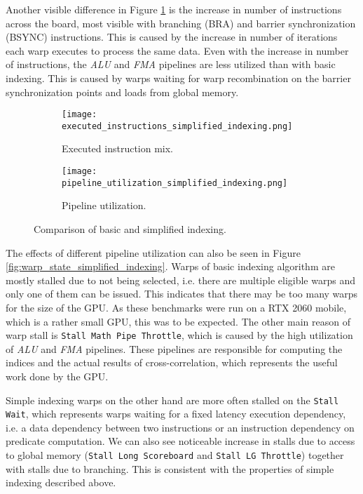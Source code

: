 Another visible difference in Figure \ref{fig:executed_instructions_simplified_indexing} is the increase in number of instructions across the board, most visible with branching (BRA) and barrier synchronization (BSYNC) instructions. This is caused by the increase in number of iterations each warp executes to process the same data. Even with the increase in number of instructions, the \textit{ALU} and \textit{FMA} pipelines are less utilized than with basic indexing. This is caused by warps waiting for warp recombination on the barrier synchronization points and loads from global memory.


\begin{figure}[ht]
	\centering	
	\begin{subfigure}{0.8\textwidth}
		\centering
		\texttt{[image: executed\_instructions\_simplified\_indexing.png]}
		\caption{Executed instruction mix.}
		\label{fig:executed_instructions_simplified_indexing}
	\end{subfigure}
	\hfill
	\begin{subfigure}{0.8\textwidth}
		\centering
		\texttt{[image: pipeline\_utilization\_simplified\_indexing.png]}
		\caption{Pipeline utilization.}
		\label{fig:pipeline_utilization_simplified_indexing}
	\end{subfigure}
	
	\caption{Comparison of basic and simplified indexing.}
\end{figure}

The effects of different pipeline utilization can also be seen in Figure \ref{fig:warp_state_simplified_indexing}. Warps of basic indexing algorithm are mostly stalled due to not being selected, i.e. there are multiple eligible warps and only one of them can be issued. This indicates that there may be too many warps for the size of the GPU. As these benchmarks were run on a RTX 2060 mobile, which is a rather small GPU, this was to be expected. The other main reason of warp stall is \texttt{Stall Math Pipe Throttle}, which is caused by the high utilization of \textit{ALU} and \textit{FMA} pipelines. These pipelines are responsible for computing the indices and the actual results of cross-correlation, which represents the useful work done by the GPU.

Simple indexing warps on the other hand are more often stalled on the \texttt{Stall Wait}, which represents warps waiting for a fixed latency execution dependency, i.e. a data dependency between two instructions or an instruction dependency on predicate computation. We can also see noticeable increase in stalls due to access to global memory (\texttt{Stall Long Scoreboard} and \texttt{Stall LG Throttle}) together with stalls due to branching. This is consistent with the properties of simple indexing described above.

